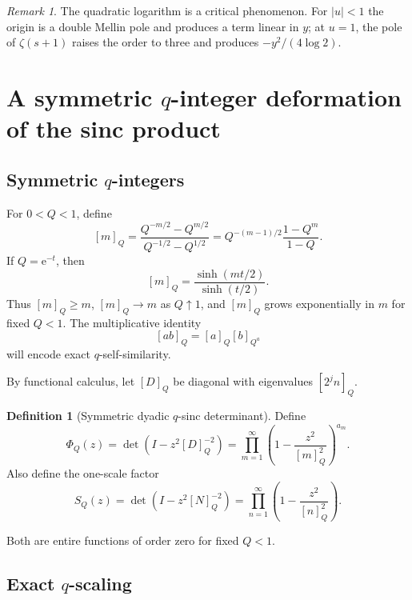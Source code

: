 \documentclass[11pt,oneside]{article}
\numberwithin{equation}{section}
\theoremstyle{plain}
\theoremstyle{definition}
\newtheorem{definition}[theorem]{Definition}
\theoremstyle{remark}
\newtheorem{remark}[theorem]{Remark}
\newcommand{\e}{\mathrm e}
\begin{document}
\begin{remark}
The quadratic logarithm is a critical phenomenon.  For $|u|<1$ the origin is a double Mellin pole and produces a term linear in $y$; at $u=1$, the pole of $\zeta(s+1)$ raises the order to three and produces $-y^2/(4\log2)$.
\end{remark}

\section{A symmetric $q$-integer deformation of the sinc product}

\subsection{Symmetric $q$-integers}

For $0<Q<1$, define
\begin{equation}\label{eq:q-int}
 [m]_Q=\frac{Q^{-m/2}-Q^{m/2}}{Q^{-1/2}-Q^{1/2}}
 =Q^{-(m-1)/2}\frac{1-Q^m}{1-Q}.
\end{equation}
If $Q=\e^{-t}$, then
\begin{equation}\label{eq:q-int-sinh}
 [m]_Q=\frac{\sinh(mt/2)}{\sinh(t/2)}.
\end{equation}
Thus $[m]_Q\ge m$, $[m]_Q\to m$ as $Q\uparrow1$, and $[m]_Q$ grows exponentially in $m$ for fixed $Q<1$.  The multiplicative identity
\begin{equation}\label{eq:q-int-mult}
 [ab]_Q=[a]_Q[b]_{Q^a}
\end{equation}
will encode exact $q$-self-similarity.

By functional calculus, let $[D]_Q$ be diagonal with eigenvalues $[2^jn]_Q$.

\begin{definition}[Symmetric dyadic $q$-sinc determinant]\label{def:PhiQ}
Define
\begin{equation}\label{eq:PhiQ}
 \boxed{\ \Phi_Q(z)=\det(I-z^2[D]_Q^{-2})
 =\prod_{m=1}^{\infty}
 \left(1-\frac{z^2}{[m]_Q^2}\right)^{a_m}.\ }
\end{equation}
Also define the one-scale factor
\begin{equation}\label{eq:SQ}
 S_Q(z)=\det(I-z^2[N]_Q^{-2})
 =\prod_{n=1}^{\infty}\left(1-\frac{z^2}{[n]_Q^2}\right).
\end{equation}
\end{definition}
Both are entire functions of order zero for fixed $Q<1$.

\subsection{Exact $q$-scaling}
\end{document}
